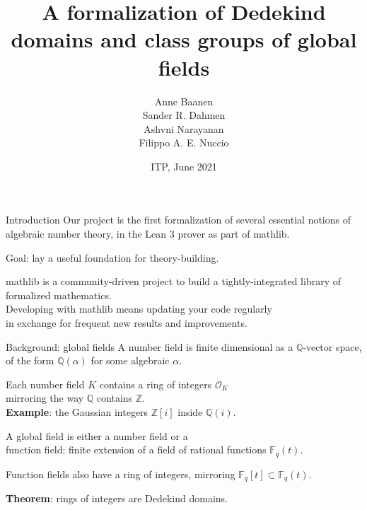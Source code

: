 \documentclass{beamer}
\title{A formalization of Dedekind domains and class groups of global fields}
\author{Anne Baanen \\ Sander R. Dahmen \\ Ashvni Narayanan \\ Filippo A. E. Nuccio}
\date{ITP, June 2021}
\newcommand*{\OK}[1][K]{\mathcal{O}_{#1}}
\newcommand*{\Fq}[1][q]{\mathbb{F}_{#1}}
\newcommand{\mathlib}{\textsf{mathlib}\xspace}
\newcommand{\Q}{\mathbb{Q}}
\newcommand{\Z}{\mathbb{Z}}
\begin{document}
\begin{frame}
	\maketitle
\end{frame}

\begin{frame}{Introduction}
	Our project is the first formalization of several essential notions of
	\alert{algebraic number theory}, in the Lean 3 prover as part of \mathlib.

	Goal: lay a useful foundation for theory-building.

	\mathlib is a community-driven project to build a tightly-integrated library of formalized mathematics.\\
	Developing with \mathlib means updating your code regularly\\
	in exchange for frequent new results and improvements.
\end{frame}

\begin{frame}{Background: global fields}
	A \alert{number field} is finite dimensional as a $\Q$-vector space,\\
	of the form $\Q(\alpha)$ for some algebraic $\alpha$.

\pause
	Each number field $K$ contains a \alert{ring of integers} $\OK$\\
	mirroring the way $\Q$ contains $\Z$.\\
	\textbf{Example}: the Gaussian integers $\Z[i]$ inside $\Q(i)$.

\pause
	A \alert{global field} is either a \alert{number field} or a\\
	\alert{function field}: finite extension of a field of rational functions $\Fq(t)$.

	Function fields also have a ring of integers, mirroring $\Fq[q][t] \subset \Fq(t)$.

\pause
	\textbf{Theorem}: rings of integers are \alert{Dedekind domains}.
\end{frame}
\end{document}
